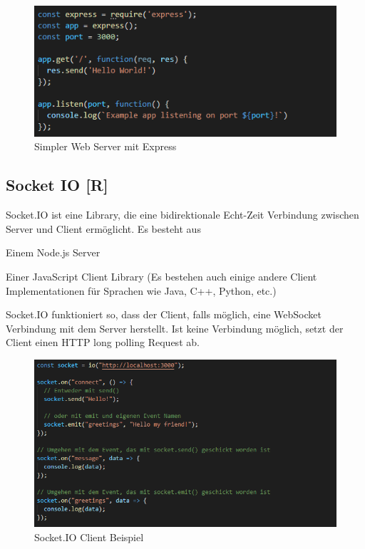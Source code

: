 \begin{figure}[H]
    \centering
    \includegraphics[scale=1]{pics/Express.PNG}
    \caption{Simpler Web Server mit Express}
\end{figure}

\subsection{Socket IO [R]}

Socket.IO ist eine Library, die eine bidirektionale Echt-Zeit Verbindung zwischen Server und Client ermöglicht. Es besteht aus 
\begin{compactitem}
    \item Einem Node.js Server
    \item Einer JavaScript Client Library (Es bestehen auch einige andere Client Implementationen für Sprachen wie Java, C++, Python, etc.)
\end{compactitem}

Socket.IO funktioniert so, dass der Client, falls möglich, eine WebSocket Verbindung mit dem Server herstellt.
Ist keine Verbindung möglich, setzt der Client einen HTTP long polling Request ab.

\begin{figure}[H]
    \centering
    \includegraphics[scale=1]{pics/SocketIO_client.PNG}
    \caption{Socket.IO Client Beispiel}
\end{figure}


